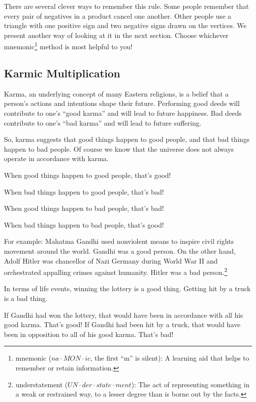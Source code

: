 There are several clever ways to remember this rule. Some people remember that every pair of negatives in a product cancel one another. Other people use a triangle with one positive sign and two negative signs drawn on the vertices. We present another way of looking at it in the next section. Choose whichever mnemonic\footnote{mnemonic ($na \cdot MON \cdot ic$, the first ``m'' is silent): A learning aid that helps to remember or retain information.} method is most helpful to you!

\subsection{Karmic Multiplication}

Karma, an underlying concept of many Eastern religions, is a belief that a person's actions and intentions shape their future. Performing good deeds will contribute to one's ``good karma'' and will lead to future happiness. Bad deeds contribute to one's ``bad karma'' and will lead to future suffering.

So, karma suggests that good things happen to good people, and that bad things happen to bad people. Of course we know that the universe does not always operate in accordance with karma.

\begin{boxeddef}
\centering
When good things happen to good people, that's good!

When bad things happen to good people, that's bad!

When good things happen to bad people, that's bad!

When bad things happen to bad people, that's good!
\end{boxeddef}

For example: Mahatma Gandhi used nonviolent means to inspire civil rights movement around the world. Gandhi was a good person. On the other hand, Adolf Hitler was chancellor of Nazi Germany during World War II and orchestrated appalling crimes against humanity. Hitler was a bad person.\footnote{understatement ($UN \cdot der \cdot state \cdot ment$): The act of representing something in a weak or restrained way, to a lesser degree than is borne out by the facts.}

In terms of life events, winning the lottery is a good thing. Getting hit by a truck is a bad thing.

If Gandhi had won the lottery, that would have been in accordance with all his good karma. That's good! If Gandhi had been hit by a truck, that would have been in opposition to all of his good karma. That's bad!

